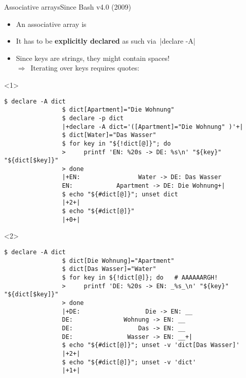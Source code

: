 \begin{frame}[fragile]{Associative arrays}{Since Bash v4.0 (2009)}
    \vspace{-5mm}
    \begin{overlayarea}{\textwidth}{0.7\textheight}
        \begin{itemize}
            \item An associative array is 
            \item It has to be \textbf{explicitly declared} as such via \,\bash|declare -A|
            \item Since keys are strings, they might contain spaces!\\
                  $\Rightarrow\,$ Iterating over keys requires quotes: 
        \end{itemize}
        \begin{onlyenv}<1>
            \begin{lstlisting}[style=MyBash, xrightmargin=1mm]
                $ declare -A dict
                $ dict[Apartment]="Die Wohnung"
                $ declare -p dict
                |+declare -A dict='([Apartment]="Die Wohnung" )'+|
                $ dict[Water]="Das Wasser"
                $ for key in "${!dict[@]}"; do
                >     printf 'EN: %20s -> DE: %s\n' "${key}" "${dict[$key]}"
                > done
                |+EN:                Water -> DE: Das Wasser
                EN:            Apartment -> DE: Die Wohnung+|
                $ echo "${#dict[@]}"; unset dict
                |+2+|
                $ echo "${#dict[@]}"
                |+0+|
            \end{lstlisting}
        \end{onlyenv}
        \begin{onlyenv}<2>
            \begin{lstlisting}[style=MyBash, firstnumber=15, xrightmargin=1mm]
                $ declare -A dict
                $ dict[Die Wohnung]="Apartment"
                $ dict[Das Wasser]="Water"
                $ for key in ${!dict[@]}; do   # AAAAAARGH!
                >     printf 'DE: %20s -> EN: _%s_\n' "${key}" "${dict[$key]}"
                > done
                |+DE:                  Die -> EN: __
                DE:              Wohnung -> EN: __
                DE:                  Das -> EN: __
                DE:               Wasser -> EN: __+|
                $ echo "${#dict[@]}"; unset -v 'dict[Das Wasser]'
                |+2+|
                $ echo "${#dict[@]}"; unset -v 'dict'
                |+1+|
            \end{lstlisting}
        \end{onlyenv}
    \end{overlayarea}
\end{frame}
